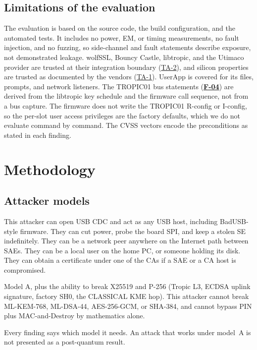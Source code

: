 \documentclass[11pt,a4paper]{article}
\newcommand{\fid}[1]{\textbf{#1}}
\begin{document}
\subsection{Limitations of the evaluation}\label{sec:limits}
The evaluation is based on the source code, the build configuration, and the automated tests. It includes no power, EM, or timing measurements, no fault injection, and no fuzzing, so side-channel and fault statements describe exposure, not demonstrated leakage. wolfSSL, Bouncy Castle, libtropic, and the Utimaco provider are trusted at their integration boundary (\hyperref[ta:TA-2]{TA-2}), and silicon properties are trusted as documented by the vendors (\hyperref[ta:TA-1]{TA-1}). UserApp is covered for its files, prompts, and network listeners. The TROPIC01 bus statements (\hyperref[f:F-04]{\fid{F-04}}) are derived from the libtropic key schedule and the firmware call sequence, not from a bus capture. The firmware does not write the TROPIC01 R-config or I-config, so the per-slot user access privileges are the factory defaults, which we do not evaluate command by command. The CVSS vectors encode the preconditions as stated in each finding.

\section{Methodology}

\subsection{Attacker models}
\begin{description}[style=nextline]
\item[Model A: classical attacker with access] This attacker can open USB CDC and act as any USB host, including BadUSB-style firmware. They can cut power, probe the board SPI, and keep a stolen SE indefinitely. They can be a network peer anywhere on the Internet path between SAEs. They can be a local user on the home PC, or someone holding its disk. They can obtain a certificate under one of the CAs if a SAE or a CA host is compromised.
\item[Model B: post-quantum attacker] Model A, plus the ability to break X25519 and P-256 (Tropic L3, ECDSA uplink signature, factory SH0, the CLASSICAL KME hop). This attacker cannot break ML-KEM-768, ML-DSA-44, AES-256-GCM, or SHA-384, and cannot bypass PIN plus MAC-and-Destroy by mathematics alone.
\end{description}
Every finding says which model it needs. An attack that works under model~A is not presented as a post-quantum result.
\end{document}
